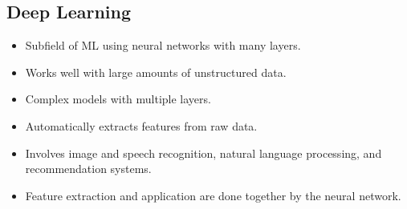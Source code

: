 \documentclass[12pt letter]{report}
\begin{document}
\subsection{Deep Learning}
\begin{itemize}
  \item Subfield of ML using neural networks with many layers.
  \item  Works well with large amounts of unstructured data.
  \item  Complex models with multiple layers.
  \item Automatically extracts features from raw data.
  \item Involves image and speech recognition, natural language processing, and recommendation systems.
  \item Feature extraction and application are done together by the neural network.
\end{itemize}
\end{document}
